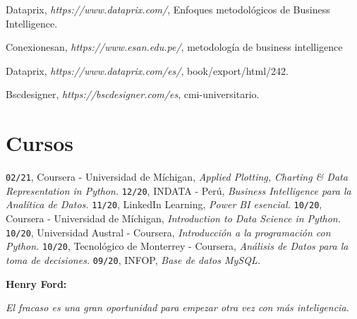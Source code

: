 \documentclass[11pt,titlepage]{report}
\begin{document}
\begin{thebibliography}{12}
 Dataprix, \textit{ https://www.dataprix.com/}, Enfoques metodológicos de Business Intelligence.
	
 Conexionesan, \textit{ https://www.esan.edu.pe/}, metodología de business intelligence
	
 Dataprix, \textit{ https://www.dataprix.com/es/}, book/export/html/242.

 Bscdesigner, \textit{ https://bscdesigner.com/es}, cmi-universitario.


\section{Cursos}
 \texttt{02/21}, Coursera - Universidad de Míchigan, \textit{Applied Plotting, Charting \& Data Representation in Python.}
 \texttt{12/20}, INDATA - Perú, \textit{Business Intelligence para la Analítica de Datos.}
 \texttt{11/20}, LinkedIn Learning, \textit{Power BI esencial.}
 \texttt{10/20}, Coursera - Universidad de Míchigan, \textit{Introduction to Data Science in Python.}
 \texttt{10/20}, Universidad Austral - Coursera, \textit{Introducción a la programación con Python.}
 \texttt{10/20}, Tecnológico de Monterrey - Coursera, \textit{Análisis de Datos para la toma de decisiones.}
 \texttt{09/20}, INFOP, \textit{Base de datos MySQL.}

	
\end{thebibliography}

\newpage
\thispagestyle{empty}
\vspace*{8cm}
\textbf{Henry Ford:\\}
\begin{center}
\textit{El fracaso es una gran oportunidad para empezar otra vez con más inteligencia.}
\end{center}

\end{document}
